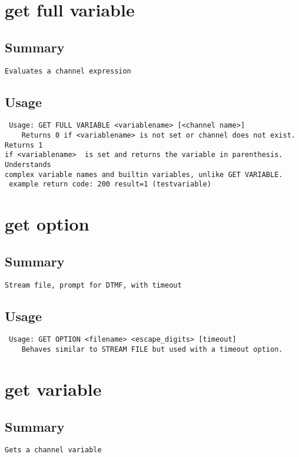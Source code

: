 \section{get full variable}
\subsection{Summary}
\begin{verbatim}
Evaluates a channel expression
\end{verbatim}
\subsection{Usage}
\begin{verbatim}
 Usage: GET FULL VARIABLE <variablename> [<channel name>]
	Returns 0 if <variablename> is not set or channel does not exist.  Returns 1
if <variablename>  is set and returns the variable in parenthesis.  Understands
complex variable names and builtin variables, unlike GET VARIABLE.
 example return code: 200 result=1 (testvariable)

\end{verbatim}


\section{get option}
\subsection{Summary}
\begin{verbatim}
Stream file, prompt for DTMF, with timeout
\end{verbatim}
\subsection{Usage}
\begin{verbatim}
 Usage: GET OPTION <filename> <escape_digits> [timeout]
	Behaves similar to STREAM FILE but used with a timeout option.

\end{verbatim}


\section{get variable}
\subsection{Summary}
\begin{verbatim}
Gets a channel variable
\end{verbatim}
